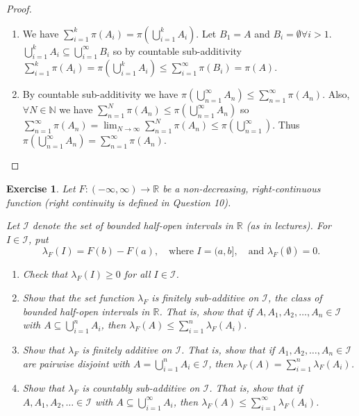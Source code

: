 \documentclass{article}
\newtheorem{exercise}[theorem]{Exercise}
\begin{document}
\begin{proof}
\begin{enumerate}
    \item[(a)] We have $\sum_{i=1}^k\pi(A_i)=\pi(\bigcup_{i=1}^k A_i)$. Let $B_1=A$ and $B_i=\emptyset\forall i>1$. $\bigcup_{i=1}^k A_i\subseteq\bigcup_{i=1}^\infty B_i$ so by countable sub-additivity $\sum_{i=1}^k\pi(A_i)=\pi(\bigcup_{i=1}^k A_i)\leq\sum_{i=1}^\infty\pi(B_i)=\pi(A)$.
    \item[(b)] By countable sub-additivity we have $\pi(\bigcup_{n=1}^\infty A_n)\leq \sum_{n=1}^\infty\pi(A_n)$. Also, $\forall N\in\mathbb{N}$ we have $\sum_{n=1}^N\pi(A_n)\leq\pi(\bigcup_{n=1}^\infty A_n)$ so $\sum_{n=1}^\infty\pi(A_n)=\lim_{N\to\infty}\sum_{n=1}^N\pi(A_n)\leq\pi(\bigcup_{n=1}^\infty)$. Thus $\pi(\bigcup_{n=1}^\infty A_n)=\sum_{n=1}^\infty\pi(A_n)$.
\end{enumerate}
\end{proof}
\begin{exercise}
    Let $F : (-\infty, \infty) \to \mathbb{R}$ be a non-decreasing, right-continuous function (right continuity is defined in Question 10).

    Let $\mathcal{I}$ denote the set of bounded half-open intervals in $\mathbb{R}$ (as in lectures). For $I \in \mathcal{I}$, put
    \[
    \lambda_F(I) = F(b) - F(a), \quad \text{where } I = (a, b], \quad \text{and } \lambda_F(\emptyset) = 0.
    \]
    \begin{enumerate}
        \item[(a)] Check that $\lambda_F(I) \geq 0$ for all $I \in \mathcal{I}$.
        \item[(b)] Show that the set function $\lambda_F$ is finitely sub-additive on $\mathcal{I}$, the class of bounded half-open intervals in $\mathbb{R}$. That is, show that if $A, A_1, A_2, \dots, A_n \in \mathcal{I}$ with $A \subseteq \bigcup_{i=1}^n A_i$, then $\lambda_F(A) \leq \sum_{i=1}^n \lambda_F(A_i)$.
        \item[(c)] Show that $\lambda_F$ is finitely additive on $\mathcal{I}$. That is, show that if $A_1, A_2, \dots, A_n \in \mathcal{I}$ are pairwise disjoint with $A = \bigcup_{i=1}^n A_i \in \mathcal{I}$, then $\lambda_F(A) = \sum_{i=1}^n \lambda_F(A_i)$.
        \item[(d)] Show that $\lambda_F$ is countably sub-additive on $\mathcal{I}$. That is, show that if $A, A_1, A_2, \dots \in \mathcal{I}$ with $A \subseteq \bigcup_{i=1}^\infty A_i$, then $\lambda_F(A) \leq \sum_{i=1}^\infty \lambda_F(A_i)$.
    \end{enumerate}
\end{exercise}
\end{document}

